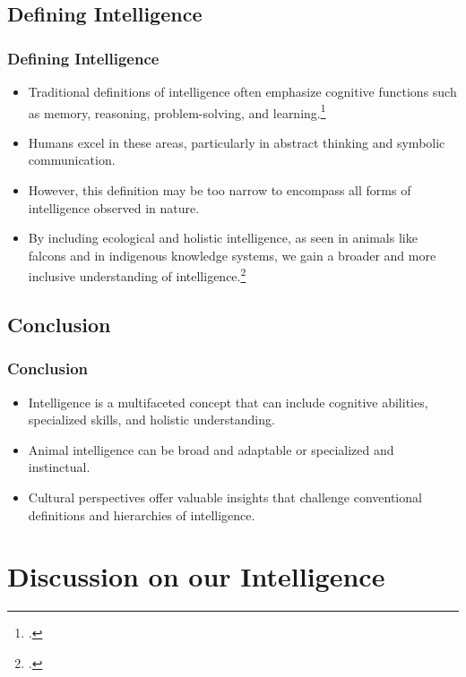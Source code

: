 \documentclass[10pt]{beamer}
\begin{document}
\subsection{Defining Intelligence}
\begin{frame}
    \frametitle{Defining Intelligence}
    \begin{itemize}
        \item Traditional definitions of intelligence often emphasize cognitive functions such as memory, reasoning, problem-solving, and learning.\footcite{gardner1983frames}
        \item Humans excel in these areas, particularly in abstract thinking and symbolic communication.
        \item However, this definition may be too narrow to encompass all forms of intelligence observed in nature.
        \item By including ecological and holistic intelligence, as seen in animals like falcons and in indigenous knowledge systems, we gain a broader and more inclusive understanding of intelligence.\footcite{holling2001understanding}
    \end{itemize}
\end{frame}

\subsection{Conclusion}
\begin{frame}
    \frametitle{Conclusion}
    \begin{itemize}
        \item Intelligence is a multifaceted concept that can include cognitive abilities, specialized skills, and holistic understanding.
        \item Animal intelligence can be broad and adaptable or specialized and instinctual.
        \item Cultural perspectives offer valuable insights that challenge conventional definitions and hierarchies of intelligence.
    \end{itemize}
\end{frame}

\section{Discussion on our Intelligence}
\end{document}
